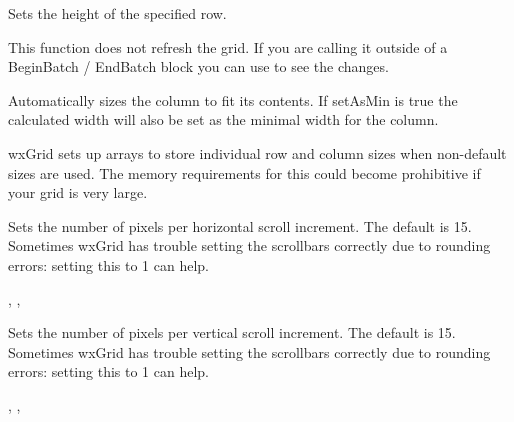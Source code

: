 \label{wxgridsetrowsize}


Sets the height of the specified row.

This function does not refresh the grid. If you are calling it outside of a BeginBatch / EndBatch
block you can use  to see the changes.

Automatically sizes the column to fit its contents. If setAsMin is true the calculated width will
also be set as the minimal width for the column.


wxGrid sets up arrays to store individual row and column sizes when non-default sizes are used.
The memory requirements for this could become prohibitive if your grid is very large.



\label{wxgridsetscrolllinex}


Sets the number of pixels per horizontal scroll increment. The default is 15.
Sometimes wxGrid has trouble setting the scrollbars correctly due to rounding
errors: setting this to 1 can help.


,\rtfsp
{},\rtfsp
{}



\label{wxgridsetscrollliney}


Sets the number of pixels per vertical scroll increment. The default is 15.
Sometimes wxGrid has trouble setting the scrollbars correctly due to rounding
errors: setting this to 1 can help.


,\rtfsp
{},\rtfsp
{}



\label{wxgridsetselectionbackground}

